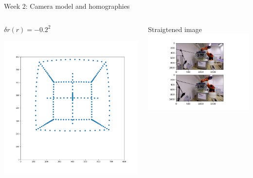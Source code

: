 \documentclass[aspectratio=169,hyperref={pdfpagelabels=false}]{beamer}
\begin{document}
\begin{frame}{ Week 2: Camera model and homographies }
\begin{columns}
	\begin{column}{.3\textwidth}
		\begin{block}{$\delta r(r) = -0.2^2$}
			\begin{center}
				\includegraphics[width=1\textwidth]{exercise_imgs/ex2-2.png}
			\end{center}
		\end{block}					
	\end{column}	
	\begin{column}{.7\textwidth}
		\begin{block}{Straigtened image}
			\includegraphics[width=\textwidth]{exercise_imgs/ex2-4.png}
		\end{block}					
	\end{column}	
\end{columns}	

\end{frame}
\end{document}
